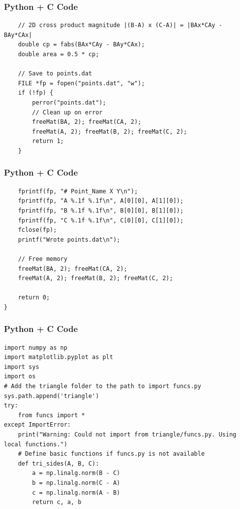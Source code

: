 \documentclass{beamer}
\begin{document}
\begin{frame}[fragile]
    \frametitle{Python + C Code}
    \begin{lstlisting}
    // 2D cross product magnitude |(B-A) x (C-A)| = |BAx*CAy - BAy*CAx|
    double cp = fabs(BAx*CAy - BAy*CAx);
    double area = 0.5 * cp;

    // Save to points.dat
    FILE *fp = fopen("points.dat", "w");
    if (!fp) {
        perror("points.dat");
        // Clean up on error
        freeMat(BA, 2); freeMat(CA, 2);
        freeMat(A, 2); freeMat(B, 2); freeMat(C, 2);
        return 1;
    }
    \end{lstlisting}
\end{frame}



\begin{frame}[fragile]
    \frametitle{Python + C Code}
    \begin{lstlisting}
    fprintf(fp, "# Point_Name X Y\n");
    fprintf(fp, "A %.1f %.1f\n", A[0][0], A[1][0]);
    fprintf(fp, "B %.1f %.1f\n", B[0][0], B[1][0]);
    fprintf(fp, "C %.1f %.1f\n", C[0][0], C[1][0]);
    fclose(fp);
    printf("Wrote points.dat\n");

    // Free memory
    freeMat(BA, 2); freeMat(CA, 2);
    freeMat(A, 2); freeMat(B, 2); freeMat(C, 2);
    
    return 0;
}
\end{lstlisting}
\end{frame}

\begin{frame}[fragile]
    \frametitle{Python + C Code}
    \begin{lstlisting}
import numpy as np
import matplotlib.pyplot as plt
import sys
import os
# Add the triangle folder to the path to import funcs.py
sys.path.append('triangle')
try:
    from funcs import *
except ImportError:
    print("Warning: Could not import from triangle/funcs.py. Using local functions.")
    # Define basic functions if funcs.py is not available
    def tri_sides(A, B, C):
        a = np.linalg.norm(B - C)
        b = np.linalg.norm(C - A)
        c = np.linalg.norm(A - B)
        return c, a, b
    \end{lstlisting}
\end{frame}
\end{document}
